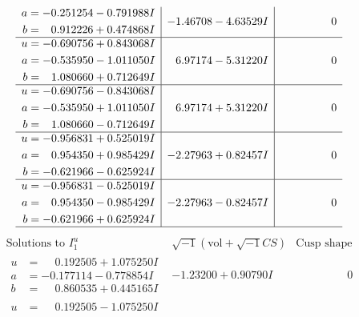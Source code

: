 \documentclass[1p]{elsarticle_modified}
\theoremstyle{definition}
\newcommand{\I}{\sqrt{-1}}
\begin{document}
$$\begin{array}{c|c|c}
\begin{aligned}
a &= -0.251254 - 0.791988 I \\
b &= \phantom{-}0.912226 + 0.474868 I\end{aligned}
 & -1.46708 - 4.63529 I & \phantom{-0.000000 } 0 \\ \hline\begin{aligned}
u &= -0.690756 + 0.843068 I \\
a &= -0.535950 - 1.011050 I \\
b &= \phantom{-}1.080660 + 0.712649 I\end{aligned}
 & \phantom{-}6.97174 - 5.31220 I & \phantom{-0.000000 } 0 \\ \hline\begin{aligned}
u &= -0.690756 - 0.843068 I \\
a &= -0.535950 + 1.011050 I \\
b &= \phantom{-}1.080660 - 0.712649 I\end{aligned}
 & \phantom{-}6.97174 + 5.31220 I & \phantom{-0.000000 } 0 \\ \hline\begin{aligned}
u &= -0.956831 + 0.525019 I \\
a &= \phantom{-}0.954350 + 0.985429 I \\
b &= -0.621966 - 0.625924 I\end{aligned}
 & -2.27963 + 0.82457 I & \phantom{-0.000000 } 0 \\ \hline\begin{aligned}
u &= -0.956831 - 0.525019 I \\
a &= \phantom{-}0.954350 - 0.985429 I \\
b &= -0.621966 + 0.625924 I\end{aligned}
 & -2.27963 - 0.82457 I & \phantom{-0.000000 } 0\\
 \hline 
 \end{array}$$\newpage$$\begin{array}{c|c|c}  
\text{Solutions to }I^u_{1}& \I (\text{vol} + \sqrt{-1}CS) & \text{Cusp shape}\\
 \hline 
\begin{aligned}
u &= \phantom{-}0.192505 + 1.075250 I \\
a &= -0.177114 - 0.778854 I \\
b &= \phantom{-}0.860535 + 0.445165 I\end{aligned}
 & -1.23200 + 0.90790 I & \phantom{-0.000000 } 0 \\ \hline\begin{aligned}
u &= \phantom{-}0.192505 - 1.075250 I \\

\end{aligned}
\end{array}$$
\end{document}
